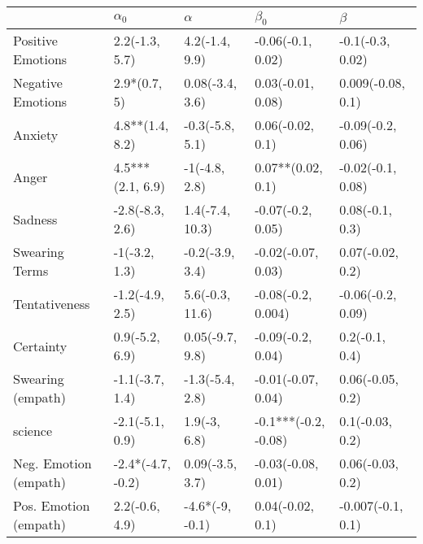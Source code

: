 \begin{tabular}{lllll}
\toprule
{} &         $\alpha_0$ &         $\alpha$ &             $\beta_0$ &            $\beta$ \\
\midrule
Positive Emotions     &     2.2(-1.3, 5.7) &   4.2(-1.4, 9.9) &     -0.06(-0.1, 0.02) &   -0.1(-0.3, 0.02) \\
Negative Emotions     &       2.9*(0.7, 5) &  0.08(-3.4, 3.6) &     0.03(-0.01, 0.08) &  0.009(-0.08, 0.1) \\
Anxiety               &    4.8**(1.4, 8.2) &  -0.3(-5.8, 5.1) &      0.06(-0.02, 0.1) &  -0.09(-0.2, 0.06) \\
Anger                 &   4.5***(2.1, 6.9) &    -1(-4.8, 2.8) &     0.07**(0.02, 0.1) &  -0.02(-0.1, 0.08) \\
Sadness               &    -2.8(-8.3, 2.6) &  1.4(-7.4, 10.3) &     -0.07(-0.2, 0.05) &    0.08(-0.1, 0.3) \\
Swearing Terms        &      -1(-3.2, 1.3) &  -0.2(-3.9, 3.4) &    -0.02(-0.07, 0.03) &   0.07(-0.02, 0.2) \\
Tentativeness         &    -1.2(-4.9, 2.5) &  5.6(-0.3, 11.6) &    -0.08(-0.2, 0.004) &  -0.06(-0.2, 0.09) \\
Certainty             &     0.9(-5.2, 6.9) &  0.05(-9.7, 9.8) &     -0.09(-0.2, 0.04) &     0.2(-0.1, 0.4) \\
Swearing (empath)     &    -1.1(-3.7, 1.4) &  -1.3(-5.4, 2.8) &    -0.01(-0.07, 0.04) &   0.06(-0.05, 0.2) \\
science               &    -2.1(-5.1, 0.9) &     1.9(-3, 6.8) &  -0.1***(-0.2, -0.08) &    0.1(-0.03, 0.2) \\
Neg. Emotion (empath) &  -2.4*(-4.7, -0.2) &  0.09(-3.5, 3.7) &    -0.03(-0.08, 0.01) &   0.06(-0.03, 0.2) \\
Pos. Emotion (empath) &     2.2(-0.6, 4.9) &  -4.6*(-9, -0.1) &      0.04(-0.02, 0.1) &  -0.007(-0.1, 0.1) \\
\bottomrule
\end{tabular}
